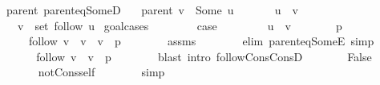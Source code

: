 \begin{isabellebody}
\isamarkupfalse%
\ {\isacharparenleft}{\kern0pt}\ parent{\isacharparenright}{\kern0pt}\ parent{\isacharunderscore}{\kern0pt}eq{\isacharunderscore}{\kern0pt}SomeD{\isacharcolon}{\kern0pt}\isanewline
\ \ \ {\isachardoublequoteopen}parent\ v\ {\isacharequal}{\kern0pt}\ Some\ u{\isachardoublequoteclose}\isanewline
\ \ \isanewline
\ \ \ \ {\isachardoublequoteopen}u\ {\isasymnoteq}\ v{\isachardoublequoteclose}\isanewline
\ \ \ \ {\isachardoublequoteopen}v\ {\isasymnotin}\ set\ {\isacharparenleft}{\kern0pt}follow\ u{\isacharparenright}{\kern0pt}{\isachardoublequoteclose}\isanewline
%
\isadelimproof
%
\endisadelimproof
%
\isatagproof
{}\isamarkupfalse%
\ {\isacharparenleft}{\kern0pt}goal{\isacharunderscore}{\kern0pt}cases{\isacharparenright}{\kern0pt}\isanewline
\ \ \isamarkupfalse%
\ {}\isanewline
\ \ \isamarkupfalse%
\ {\isacharquery}{\kern0pt}case\isanewline
\ \ \isamarkupfalse%
\isanewline
\ \ \ \ \isamarkupfalse%
\ {\isachardoublequoteopen}u\ {\isacharequal}{\kern0pt}\ v{\isachardoublequoteclose}\isanewline
\ \ \ \ \isamarkupfalse%
\ \isamarkupfalse%
\ p\ \isanewline
\ \ \ \ \ \ {\isachardoublequoteopen}follow\ v\ {\isacharequal}{\kern0pt}\ v\ {\isacharhash}{\kern0pt}\ v\ {\isacharhash}{\kern0pt}\ p{\isachardoublequoteclose}\isanewline
\ \ \ \ \ \ \isamarkupfalse%
\ assms\isanewline
\ \ \ \ \ \ \isamarkupfalse%
\ {\isacharparenleft}{\kern0pt}elim\ parent{\isacharunderscore}{\kern0pt}eq{\isacharunderscore}{\kern0pt}SomeE{\isacharparenright}{\kern0pt}\ simp\isanewline
\ \ \ \ \isamarkupfalse%
\ \isamarkupfalse%
\ {\isachardoublequoteopen}follow\ v\ {\isacharequal}{\kern0pt}\ v\ {\isacharhash}{\kern0pt}\ p{\isachardoublequoteclose}\isanewline
\ \ \ \ \ \ \isamarkupfalse%
\ {\isacharparenleft}{\kern0pt}blast\ intro{\isacharcolon}{\kern0pt}\ follow{\isacharunderscore}{\kern0pt}Cons{\isacharunderscore}{\kern0pt}ConsD{\isacharparenleft}{\kern0pt}{}{\isacharparenright}{\kern0pt}{\isacharparenright}{\kern0pt}\isanewline
\ \ \ \ \isamarkupfalse%
\ \isamarkupfalse%
\ False\isanewline
\ \ \ \ \ \ \isamarkupfalse%
\ not{\isacharunderscore}{\kern0pt}Cons{\isacharunderscore}{\kern0pt}self\isanewline
\ \ \ \ \ \ \isamarkupfalse%
\ simp\isanewline
\ \ \isamarkupfalse%
\isanewline

\end{isabellebody}
